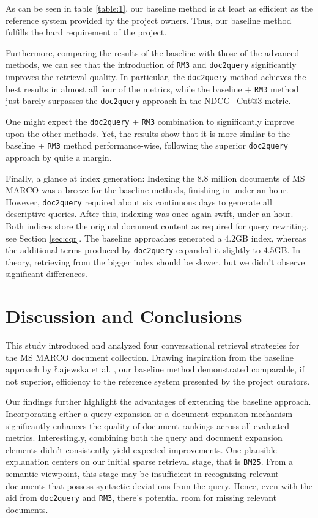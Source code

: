\documentclass[sigconf]{acmart}
\begin{document}
As can be seen in table \ref{table:1}, our baseline method is at least as efficient as the reference system provided by the project owners. Thus, our baseline method fulfills the hard requirement of the project.

Furthermore, comparing the results of the baseline with those of the advanced methods, we can see that the introduction of \texttt{RM3} and \texttt{doc2query} significantly improves the retrieval quality. In particular, the \texttt{doc2query} method achieves the best results in almost all four of the metrics, while the baseline + \texttt{RM3} method just barely surpasses the \texttt{doc2query} approach in the NDCG\_Cut@3 metric.

One might expect the \texttt{doc2query} + \texttt{RM3} combination to significantly improve upon the other methods. Yet, the results show that it is more similar to the baseline + \texttt{RM3} method performance-wise, following the superior \texttt{doc2query} approach by quite a margin.

Finally, a glance at index generation: Indexing the 8.8 million documents of MS MARCO was a breeze for the baseline methods, finishing in under an hour. However, \texttt{doc2query} required about six continuous days to generate all descriptive queries. After this, indexing was once again swift, under an hour. Both indices store the original document content as required for query rewriting, see Section \ref{sec:cqr}. The baseline approaches generated a $4.2$GB index, whereas the additional terms produced by \texttt{doc2query} expanded it slightly to $4.5$GB. In theory, retrieving from the bigger index should be slower, but we didn't observe significant differences.

\section{Discussion and Conclusions}
This study introduced and analyzed four conversational retrieval strategies for the MS MARCO document collection. Drawing inspiration from the baseline approach by Łajewska et al. \cite{Lajewska:2023:ECIR}, our baseline method demonstrated comparable, if not superior, efficiency to the reference system presented by the project curators.

Our findings further highlight the advantages of extending the baseline approach. Incorporating either a query expansion or a document expansion mechanism significantly enhances the quality of document rankings across all evaluated metrics. Interestingly, combining both the query and document expansion elements didn't consistently yield expected improvements. One plausible explanation centers on our initial sparse retrieval stage, that is \texttt{BM25}. From a semantic viewpoint, this stage may be insufficient in recognizing relevant documents that possess syntactic deviations from the query. Hence, even with the aid from \texttt{doc2query} and \texttt{RM3}, there's potential room for missing relevant documents.
\end{document}

